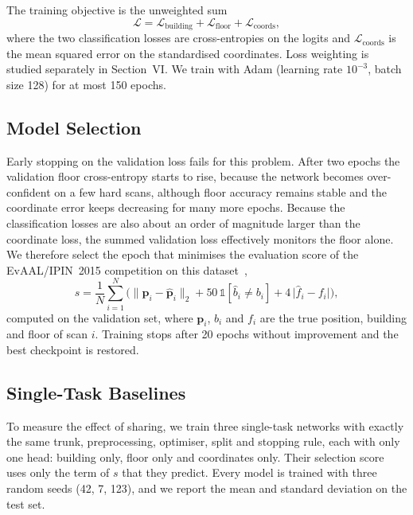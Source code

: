 The training objective is the unweighted sum
\begin{equation}
\mathcal{L} = \mathcal{L}_{\text{building}} + \mathcal{L}_{\text{floor}} + \mathcal{L}_{\text{coords}},
\end{equation}
where the two classification losses are cross-entropies on the logits and $\mathcal{L}_{\text{coords}}$ is
the mean squared error on the standardised coordinates. Loss weighting is studied separately in
Section~VI. We train with Adam (learning rate $10^{-3}$, batch size 128) for at most 150 epochs.

\subsection{Model Selection}

Early stopping on the validation loss fails for this problem. After two epochs the validation floor
cross-entropy starts to rise, because the network becomes over-confident on a few hard scans, although
floor accuracy remains stable and the coordinate error keeps decreasing for many more epochs. Because the
classification losses are also about an order of magnitude larger than the coordinate loss, the summed
validation loss effectively monitors the floor alone. We therefore select the epoch that minimises the
evaluation score of the EvAAL/IPIN~2015 competition on this dataset~\cite{evaal2015},
\begin{equation}
s = \frac{1}{N}\sum_{i=1}^{N} \Big( \lVert \mathbf{p}_i - \hat{\mathbf{p}}_i \rVert_2
      + 50\,\mathbb{1}[\hat{b}_i \neq b_i] + 4\,\lvert \hat{f}_i - f_i \rvert \Big),
\end{equation}
computed on the validation set, where $\mathbf{p}_i$, $b_i$ and $f_i$ are the true position, building and
floor of scan $i$. Training stops after 20 epochs without improvement and the best checkpoint is restored.

\subsection{Single-Task Baselines}

To measure the effect of sharing, we train three single-task networks with exactly the same trunk,
preprocessing, optimiser, split and stopping rule, each with only one head: building only, floor only and
coordinates only. Their selection score uses only the term of $s$ that they predict. Every model is
trained with three random seeds (42, 7, 123), and we report the mean and standard deviation on the test set.

